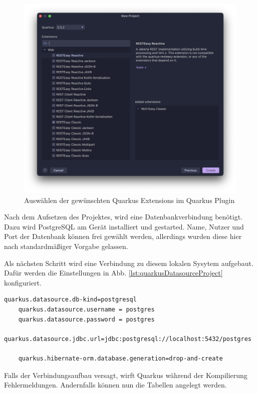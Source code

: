 \begin{figure}
    \centering
    \includegraphics[scale=0.4]{pics/quarkusplugin.png}
    \caption{Auswählen der gewünschten Quarkus Extensions im Quarkus Plugin}
    \label{fig:intellij:plugin}
\end{figure}

Nach dem Aufsetzen des Projektes, wird eine Datenbankverbindung benötigt. 
Dazu wird PostgreSQL am Gerät installiert und gestarted.
Name, Nutzer und Port der Datenbank können frei gewählt werden, allerdings wurden diese hier nach standardmäßiger Vorgabe gelassen.

Als nächsten Schritt wird eine Verbindung zu diesem lokalen Sysytem aufgebaut. 
Dafür werden die Einstellungen in Abb. \ref{lst:quarkusDatasourceProject} konfiguriert.

\begin{lstlisting}[label=lst:quarkusDatasourceProject]
    quarkus.datasource.db-kind=postgresql
    quarkus.datasource.username = postgres
    quarkus.datasource.password = postgres
    quarkus.datasource.jdbc.url=jdbc:postgresql://localhost:5432/postgres

    quarkus.hibernate-orm.database.generation=drop-and-create
\end{lstlisting}

Falls der Verbindungsaufbau versagt, wirft Quarkus während der Kompilierung Fehlermeldungen. 
Andernfalls können nun die Tabellen angelegt werden. 

